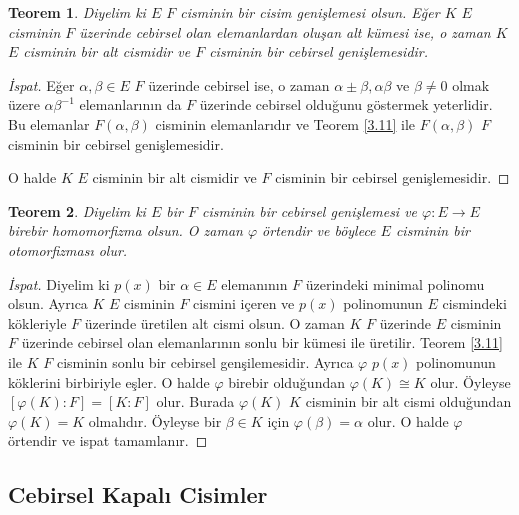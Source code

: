 \documentclass{article}
\newtheorem{thm}{Teorem}[section]
\theoremstyle{definition}
\theoremstyle{remark}
\begin{document}
            \begin{thm}\label{3.12}
                Diyelim ki $E$ $F$ cisminin bir cisim genişlemesi olsun. Eğer $K$ $E$ cisminin $F$ üzerinde cebirsel olan elemanlardan oluşan alt kümesi ise, o zaman $K$ $E$ cisminin bir alt cismidir ve $F$ cisminin bir cebirsel genişlemesidir.
            \end{thm}
            
            \begin{proof}[İspat]
                Eğer $\alpha, \beta \in E$ $F$ üzerinde cebirsel ise, o zaman $\alpha \pm \beta, \alpha\beta $ ve $\beta \neq 0$ olmak üzere $\alpha\beta^{-1}$ elemanlarının da $F$ üzerinde cebirsel olduğunu göstermek yeterlidir. Bu elemanlar $F(\alpha, \beta)$ cisminin elemanlarıdır ve Teorem \ref{3.11} ile $F(\alpha, \beta)$ $F$ cisminin bir cebirsel genişlemesidir.\par
                O halde $K$ $E$ cisminin bir alt cismidir ve $F$ cisminin bir cebirsel genişlemesidir.
            \end{proof}
            
            \begin{thm}\label{3.13}
                Diyelim ki $E$ bir $F$ cisminin bir cebirsel genişlemesi ve $\varphi: E \to E$ birebir homomorfizma olsun. O zaman $\varphi$ örtendir ve böylece $E$ cisminin bir otomorfizması olur.
            \end{thm}
            
            \begin{proof}[İspat]
                Diyelim ki $p(x)$ bir $\alpha \in E$ elemanının $F$ üzerindeki minimal polinomu olsun. Ayrıca $K$ $E$ cisminin $F$ cismini içeren ve $p(x)$ polinomunun $E$ cismindeki kökleriyle $F$ üzerinde üretilen alt cismi olsun. O zaman $K$ $F$ üzerinde $E$ cisminin $F$ üzerinde cebirsel olan elemanlarının sonlu bir kümesi ile üretilir. Teorem \ref{3.11} ile $K$ $F$ cisminin sonlu bir cebirsel genşilemesidir. Ayrıca $\varphi$ $p(x)$ polinomunun köklerini birbiriyle eşler. O halde $\varphi$ birebir olduğundan $\varphi(K) \cong K$ olur. Öyleyse $[\varphi(K) : F] = [K : F]$ olur. Burada $\varphi(K)$ $K$ cisminin bir alt cismi olduğundan $\varphi(K) = K$ olmalıdır. Öyleyse bir $\beta \in K$ için $\varphi(\beta) = \alpha$ olur. O halde $\varphi$ örtendir ve ispat tamamlanır.
            \end{proof}
            
        \subsection{Cebirsel Kapalı Cisimler}
        
\end{document}

